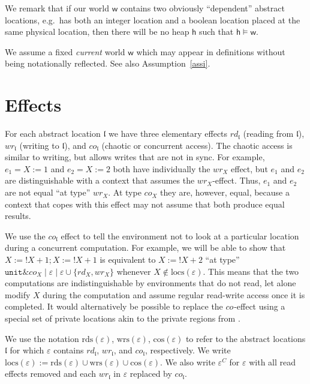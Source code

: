 \documentclass[nocopyrightspace,preprint]{sigplanconf}
\newcommand{\keywd}[1]{\mathtt{#1}}
\newcommand{\myread}[1]{!{#1}}
\newcommand{\unittype}{\keywd{unit}}
\newcommand{\assign}[2]{{#1}:={#2}}
\newcommand{\eff}{\varepsilon}
\newcommand{\reads}{\mathrm{rds}}
\newcommand{\rds}{\reads}
\newcommand{\writes}{\mathrm{wrs}}
\newcommand{\wrs}{\writes}
\newcommand{\concs}[1]{\mathrm{cos}(#1)}
\newcommand{\locs}[1]{\mathrm{locs}(#1)}
\newcommand{\rEff}[1]{\ensuremath{\mathit{rd}_{#1}}}
\newcommand{\cEff}[1]{\ensuremath{\mathit{co}_{#1}}}
\newcommand{\wEff}[1]{\ensuremath{\mathit{wr}_{#1}}}
\newcommand{\loc}{\mathfrak{l}}
\newcommand\w{\ensuremath{\mathsf{w}}\xspace}
\newcommand\heap{\ensuremath{\mathsf{h}}\xspace}
\newcommand\h{\heap}
\newcommand{\myety}[4]{{#1}\mathrel{\&}{#2} \mid #3 \mid #4}
\begin{document}
We remark that if our world $\w$ contains two obviously ``dependent'' abstract locations, e.g.\ has  both an integer location and a boolean location
placed at the same physical location, then there will be no heap $\h$ such that $\h\models\w$. 

We assume a fixed \emph{current} world $\w$ which may appear in definitions without being notationally reflected. See also Assumption~\ref{assi}.
\section{Effects}
For each abstract location $\loc$ we have three elementary effects
$\rEff\loc$ (reading from $\loc$), $\wEff\loc$ (writing to $\loc$),
and $\cEff\loc$ (chaotic or concurrent access). The chaotic access is
similar to writing, but allows writes that are not in sync. For
example, $e_1 = \assign{X}{1}$ and $e_2 = \assign{X}{2}$ both have
individually the $\wEff{X}$ effect, but $e_1$ and $e_2$ are
distinguishable with a context that assumes the
$\wEff{X}$-effect. Thus, $e_1$ and $e_2$ are not equal ``at type''
$\wEff{X}$. At type $\cEff{X}$ they are, however, equal, because a
context that copes with this effect may not assume that both produce
equal results.

We use the $\cEff{\loc}$ effect to tell the environment not to look at
a particular location during a concurrent computation. For example, we
will be able to show that $\assign{X}{\myread{X}+1};\assign{X}{
  \myread{X}+1}$ is equivalent to $\assign{X}{ \myread{X}+2}$ ``at
type'' $\myety{\unittype}{\cEff{X}}{\eff}{\eff\cup\{\rEff{X},\wEff{X}\}}$ whenever $X\notin\locs{\eff}$. This means that
the two computations are indistinguishable by environments that do not
read, let alone modify $X$ during the computation and assume regular
read-write access once it is completed.
It would alternatively be possible to replace the $\cEff{}$-effect
using a special set of private locations akin to the private regions
from \cite{birkedal}.

We use the notation $\rds(\eff)$, $\wrs(\eff)$, $\concs{\eff}$ to
refer to the abstract locations $\loc$ for which $\eff$ contains
$\rEff\loc$, $\wEff\loc$, and $\cEff\loc$, respectively. We write
$\locs\eff:=\rds(\eff)\cup\wrs(\eff)\cup\concs{\eff}$.  We also write
$\eff^C$ for $\eff$ with all read effects removed and each $\wEff\loc$ in $\eff$ replaced by
$\cEff\loc$.
\end{document}
